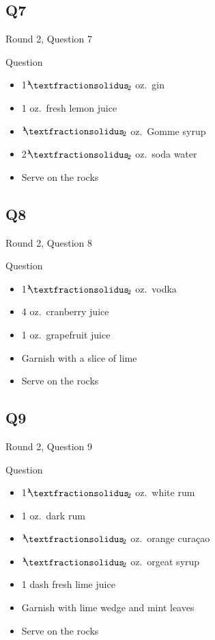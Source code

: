 \documentclass[11pt]{beamer}
\begin{document}
\subsection*{Q7}
\begin{frame}[t]{Round 2, Question 7}
\begin{block}{Question}
\begin{itemize}
\item 1\({}^1{\mskip -5mu⁄\mskip -3mu}_2\) oz.\ gin
\item 1 oz.\ fresh lemon juice
\item \({}^1{\mskip -5mu⁄\mskip -3mu}_2\) oz.\ Gomme syrup
\item 2\({}^1{\mskip -5mu⁄\mskip -3mu}_2\) oz.\ soda water
\item Serve on the rocks
\end{itemize}
\end{block}
\end{frame}
\subsection*{Q8}
\begin{frame}[t]{Round 2, Question 8}
\begin{block}{Question}
\begin{itemize}
\item 1\({}^1{\mskip -5mu⁄\mskip -3mu}_2\) oz.\ vodka
\item 4 oz.\ cranberry juice
\item 1 oz.\ grapefruit juice
\item Garnish with a slice of lime
\item Serve on the rocks
\end{itemize}
\end{block}
\end{frame}
\subsection*{Q9}
\begin{frame}[t]{Round 2, Question 9}
\begin{block}{Question}
\begin{itemize}
\item 1\({}^1{\mskip -5mu⁄\mskip -3mu}_2\) oz.\ white rum
\item 1 oz.\ dark rum
\item \({}^1{\mskip -5mu⁄\mskip -3mu}_2\) oz.\ orange curaçao
\item \({}^1{\mskip -5mu⁄\mskip -3mu}_2\) oz.\ orgeat syrup
\item 1 dash fresh lime juice
\item Garnish with lime wedge and mint leaves
\item Serve on the rocks
\end{itemize}
\end{block}
\end{frame}
\end{document}

